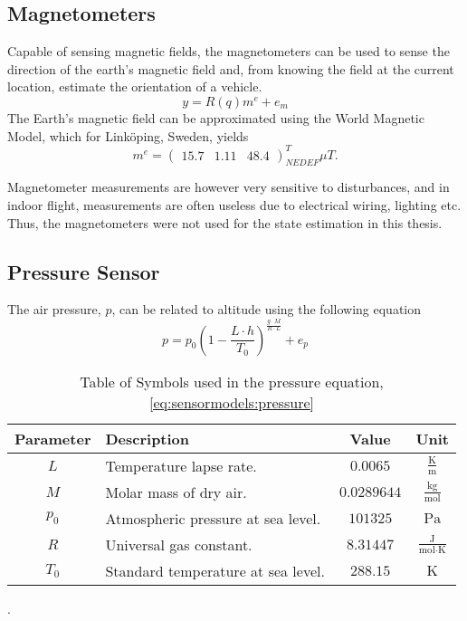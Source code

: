     \subsection{Magnetometers}
        Capable of sensing magnetic fields, the magnetometers can be used to
        sense the direction of the earth's magnetic field and, from knowing
        the field at the current location, estimate the orientation of a vehicle.
        \begin{equation}
            y = R(q) m^{e} + e_{m}
        \end{equation}
        The Earth's magnetic field can be approximated using the World Magnetic Model\cite{wmm2010},
        which for Linköping, Sweden, yields
        \begin{equation}
            m^{e} = \left(\begin{array}{ccc}
                15.7 & 1.11 & 48.4
            \end{array}\right)_{NEDEF}^{T} \mu T.
        \end{equation}

        Magnetometer measurements are however very sensitive to disturbances, and in indoor
        flight, measurements are often useless due to electrical wiring, lighting etc.
        Thus, the magnetometers were not used for the state estimation in this thesis.

    \subsection{Pressure Sensor}
        The air pressure, $p$, can be related to altitude using the following equation\cite{physicshandbook}
        \begin{equation}
            \label{eq:sensormodels:pressure}
            p = p_{0} \left( 1 - \frac{L \cdot h}{T_{0}} \right)^{\frac{g \cdot M}{R\cdot L}} + e_{p}
        \end{equation}
        \begin{table}
            \begin{tabularx}{\tablewidth}{|c|X|c|c|}\hline
                \textbf{Parameter} & \textbf{Description} & \textbf{Value} & \textbf{Unit} \\\hline
                $L$       & Temperature lapse rate.            & $0.0065$ & $\frac{\text{K}}{\text{m}}$ \\\hline
                $M$       & Molar mass of dry air.             & $0.0289644$ & $\frac{\text{kg}}{\text{mol}}$ \\\hline
                $p_{0}$   & Atmospheric pressure at sea level. & $101325$ & $\text{Pa}$ \\\hline
                $R$       & Universal gas constant.            & $8.31447$ & $\frac{\text{J}}{\text{mol} \cdot \text{K}}$ \\\hline
                $T_{0}$   & Standard temperature at sea level. & $288.15$ & $\text{K}$ \\\hline
            \end{tabularx}
            \label{tos:pressuresensor}
            \caption{Table of Symbols used in the pressure equation, \eqref{eq:sensormodels:pressure}}.
        \end{table}

    
